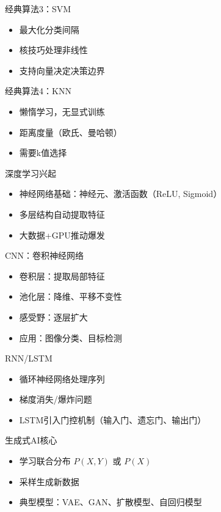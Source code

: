 \begin{frame}{经典算法3：SVM}
\begin{itemize}
    \item 最大化分类间隔
    \item 核技巧处理非线性
    \item 支持向量决定决策边界
\end{itemize}
\end{frame}

\begin{frame}{经典算法4：KNN}
\begin{itemize}
    \item 懒惰学习，无显式训练
    \item 距离度量（欧氏、曼哈顿）
    \item 需要k值选择
\end{itemize}
\end{frame}

\begin{frame}{深度学习兴起}
\begin{itemize}
    \item 神经网络基础：神经元、激活函数（ReLU, Sigmoid）
    \item 多层结构自动提取特征
    \item 大数据+GPU推动爆发
\end{itemize}
\end{frame}

\begin{frame}{CNN：卷积神经网络}
\begin{itemize}
    \item 卷积层：提取局部特征
    \item 池化层：降维、平移不变性
    \item 感受野：逐层扩大
    \item 应用：图像分类、目标检测
\end{itemize}
\end{frame}

\begin{frame}{RNN/LSTM}
\begin{itemize}
    \item 循环神经网络处理序列
    \item 梯度消失/爆炸问题
    \item LSTM引入门控机制（输入门、遗忘门、输出门）
\end{itemize}
\end{frame}

\begin{frame}{生成式AI核心}
\begin{itemize}
    \item 学习联合分布 \(P(X,Y)\) 或 \(P(X)\)
    \item 采样生成新数据
    \item 典型模型：VAE、GAN、扩散模型、自回归模型
\end{itemize}
\end{frame}

